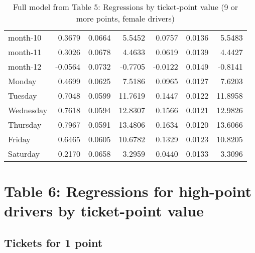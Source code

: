 \documentclass[10pt]{article}
\begin{document}
\begin{table}[ht]
\begin{tabular}{lrrrrrr}
  month-10 & 0.3679 & 0.0664 & 5.5452 & 0.0757 & 0.0136 & 5.5483 \\ 
  month-11 & 0.3026 & 0.0678 & 4.4633 & 0.0619 & 0.0139 & 4.4427 \\ 
  month-12 & -0.0564 & 0.0732 & -0.7705 & -0.0122 & 0.0149 & -0.8141 \\ 
  Monday & 0.4699 & 0.0625 & 7.5186 & 0.0965 & 0.0127 & 7.6203 \\ 
  Tuesday & 0.7048 & 0.0599 & 11.7619 & 0.1447 & 0.0122 & 11.8958 \\ 
  Wednesday & 0.7618 & 0.0594 & 12.8307 & 0.1566 & 0.0121 & 12.9826 \\ 
  Thursday & 0.7967 & 0.0591 & 13.4806 & 0.1634 & 0.0120 & 13.6066 \\ 
  Friday & 0.6465 & 0.0605 & 10.6782 & 0.1329 & 0.0123 & 10.8205 \\ 
  Saturday & 0.2170 & 0.0658 & 3.2959 & 0.0440 & 0.0133 & 3.3096 \\ 
   \hline
\end{tabular}
\caption{Full model from Table 5: Regressions by ticket-point value (9 or more points, female drivers)} 
\label{tab_5_9plus_pts_no_age_F}
\end{table}


\clearpage
\pagebreak




\section{Table 6: Regressions for high-point drivers by ticket-point value}




\subsection{Tickets for 1 point}



\end{document}
